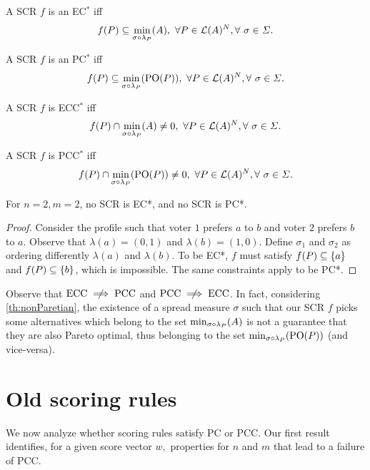\documentclass[version=3.21, pagesize, twoside=off, bibliography=totoc, DIV=calc, fontsize=12pt, a4paper]{scrartcl}
\begin{document}
\begin{definition} A SCR $f$ is an EC$^*$ iff \[f(P) \subseteq \musigma, \ \forall P \in \linors^N, \forall \ \sigma \in \Sigma.\]
\end{definition}

\begin{definition} A SCR $f$ is an PC$^*$ iff \[f(P) \subseteq \mustar, \ \forall P \in \linors^N, \forall \ \sigma \in \Sigma.\]
\end{definition}

\begin{definition} A SCR $f$ is ECC$^*$ iff \[f(P) \cap \musigma \neq 0, \ \forall P \in \linors^N, \forall \ \sigma \in \Sigma.\]
\end{definition}

\begin{definition} A SCR $f$ is PCC$^*$ iff \[ f(P) \cap \mustar \neq 0, \ \forall P \in \linors^N, \forall \ \sigma \in \Sigma.\]
\end{definition}

\begin{proposition}
	For $n=2, m=2$, no SCR is EC*, and no SCR is PC*.
\end{proposition}
\begin{proof}
	Consider the profile such that voter $1$ prefers $a$ to $b$ and voter $2$ prefers $b$ to $a$. Observe that $\lambda(a) = (0, 1)$ and $\lambda(b) = (1, 0)$. Define $\sigma_1$ and $\sigma_2$ as ordering differently $\lambda(a)$ and $\lambda(b)$. To be EC*, $f$ must satisfy $f(P) \subseteq \{a\}$ and $f(P) \subseteq \{b\}$, which is impossible. The same constraints apply to be PC*.
\end{proof}

\begin{remark}
	Observe that $\text{ECC} \centernot \implies \text{PCC}$ and $\text{PCC} \centernot \implies \text{ECC}$.
	In fact, considering \cref{th:nonParetian}, the existence of a spread measure $\sigma$ such that our SCR $f$ picks some alternatives which belong to the set $\musigma$ is not a guarantee that they are also Pareto optimal, thus belonging to the set $\mustar$ (and vice-versa).
\end{remark}

\section{Old scoring rules}

We now analyze whether scoring rules satisfy PC or PCC. Our first result
identifies, for a given score vector $w,$ properties for $n$ and $m$ that
lead to a failure of PCC.
\end{document}
